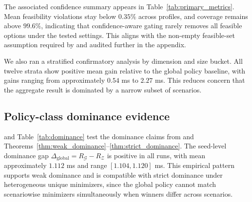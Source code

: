 \documentclass{article} %
\begin{document}
The associated confidence summary appears in Table~\ref{tab:primary_metrics}. Mean feasibility violations stay below $0.35\%$ across profiles, and coverage remains above $99.6\%$, indicating that confidence-aware gating rarely removes all feasible options under the tested settings. This aligns with the non-empty feasible-set assumption required by  and audited further in the appendix.

\begin{table}[t]
\caption{Primary selector performance by deployment prior with 95\% confidence intervals. Each row reports means and interval bounds for constrained latency, constrained regret, and feasibility behavior. The table links directly to the claims tested in : non-positive regret relative to global static baselines and low violation rates under confidence-aware feasibility.}
\label{tab:primary_metrics}
\centering
\small
\renewcommand{\arraystretch}{1.1}
\setlength{\tabcolsep}{4pt}
\end{table}

We also ran a stratified confirmatory analysis by dimension and size bucket. All twelve strata show positive mean gain relative to the global policy baseline, with gains ranging from approximately $0.54$ ms to $2.27$ ms. This reduces concern that the aggregate result is dominated by a narrow subset of scenarios.

\subsection{Policy-class dominance evidence}
\label{sec:results_dominance}
 and Table~\ref{tab:dominance} test the dominance claims from  and Theorems~\ref{thm:weak_dominance}--\ref{thm:strict_dominance}. The seed-level dominance gap $\Delta_{\mathrm{global}}=R_{\mathcal{G}}-R_{\mathcal{Z}}$ is positive in all runs, with mean approximately $1.112$ ms and range $[1.104,1.120]$ ms. This empirical pattern supports weak dominance and is compatible with strict dominance under heterogeneous unique minimizers, since the global policy cannot match scenariowise minimizers simultaneously when winners differ across scenarios.
\end{document}
